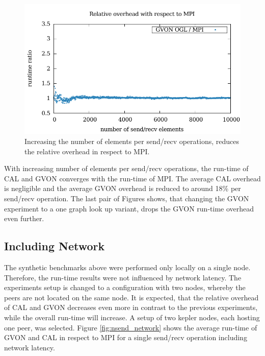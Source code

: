 \begin{figure}[H]
\begin{minipage}[t]{0.5\textwidth}
    \includegraphics[width=\textwidth]{plots/50_nsize_one_lookup_overhead_gvon_kepler}
  \end{minipage}%
  \caption{Increasing the number of elements per send/recv operations,
    reduces the relative overhead in respect to MPI.}
  \label{fig:nsize_kepler}
\end{figure}

\noindent With increasing number of elements per send/recv operations,
the run-time of CAL and GVON converges with the run-time of MPI. The
average CAL overhead is negligible and the average GVON overhead is
reduced to around 18\% per send/recv operation. The last pair of
Figures shows, that changing the GVON experiment to a one graph look
up variant, drops the GVON run-time overhead even further.

\subsection*{Including Network}
The synthetic benchmarks above were performed only locally on a single node.
Therefore, the run-time results were not influenced by network latency.
The experiments setup is changed to a configuration with two
nodes, whereby the peers are not located on the same node. It is
expected, that the relative overhead of CAL and GVON decreases even
more in contrast to the previous experiments, while the overall
run-time will increase.  A setup of two kepler nodes, each hosting one
peer, was selected.  Figure \ref{fig:nsend_network} shows the average
run-time of GVON and CAL in respect to MPI for a single send/recv
operation including network latency.

